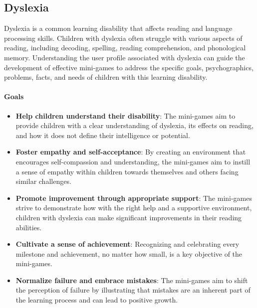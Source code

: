 \subsection{Dyslexia}
Dyslexia is a common learning disability that affects reading and language processing skills. Children with dyslexia often struggle with various aspects of reading, including decoding, spelling, reading comprehension, and phonological memory. Understanding the user profile associated with dyslexia can guide the development of effective mini-games to address the specific goals, psychographics, problems, facts, and needs of children with this learning disability.

\paragraph{\textbf{Goals}}
\begin{itemize}
    \item \textbf{Help children understand their disability}: The mini-games aim to provide children with a clear understanding of dyslexia, its effects on reading, and how it does not define their intelligence or potential.
    \item \textbf{Foster empathy and self-acceptance}: By creating an environment that encourages self-compassion and understanding, the mini-games aim to instill a sense of empathy within children towards themselves and others facing similar challenges.
    \item \textbf{Promote improvement through appropriate support}: The mini-games strive to demonstrate how with the right help and a supportive environment, children with dyslexia can make significant improvements in their reading abilities.
    \item \textbf{Cultivate a sense of achievement}: Recognizing and celebrating every milestone and achievement, no matter how small, is a key objective of the mini-games.
    \item \textbf{Normalize failure and embrace mistakes}: The mini-games aim to shift the perception of failure by illustrating that mistakes are an inherent part of the learning process and can lead to positive growth.
\end{itemize}

